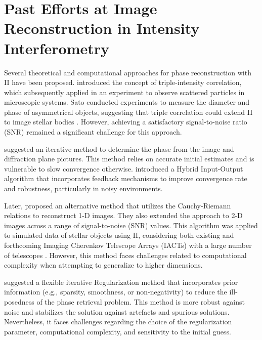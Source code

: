 \section{Past Efforts at Image Reconstruction in Intensity Interferometry}
Several theoretical and computational approaches for phase reconstruction with II have been proposed. \cite{gamo1963triple} introduced the concept of triple-intensity correlation, which \cite{goldberger1963use} subsequently applied in an experiment to observe scattered particles in microscopic systems. Sato conducted experiments to measure the diameter and phase of asymmetrical objects, suggesting that triple correlation could extend II to image stellar bodies \citep{sato1978imaging, sato1979computer, sato1981adaptive}. However, achieving a satisfactory signal-to-noise ratio (SNR) remained a significant challenge for this approach.

\cite{GerchbergSaxton1972} suggested an iterative method to determine the phase from the image and diffraction plane pictures. This method relies on accurate initial estimates and is vulnerable to slow convergence otherwise. \cite{Fienup1982} introduced a Hybrid Input-Output algorithm that incorporates feedback mechanisms to improve convergence rate and robustness, particularly in noisy environments.

Later, \cite{holmes2010two} proposed an alternative method that utilizes the Cauchy-Riemann relations to reconstruct 1-D images. They also extended the approach to 2-D images across a range of signal-to-noise (SNR) values. This algorithm was applied to simulated data of stellar objects using II, considering both existing and forthcoming Imaging Cherenkov Telescope Arrays (IACTs) with a large number of telescopes \citep{nunez2010stellar, nunez2012high, nunez2012imaging}. However, this method faces challenges related to computational complexity when attempting to generalize to higher dimensions.

\cite{Li2014} suggested a flexible iterative Regularization method that incorporates prior information (e.g., sparsity, smoothness, or non-negativity) to reduce the ill-posedness of the phase retrieval problem. This method is more robust against noise and stabilizes the solution against artefacts and spurious solutions. Nevertheless, it faces challenges regarding the choice of the regularization parameter, computational complexity, and sensitivity to the initial guess.

